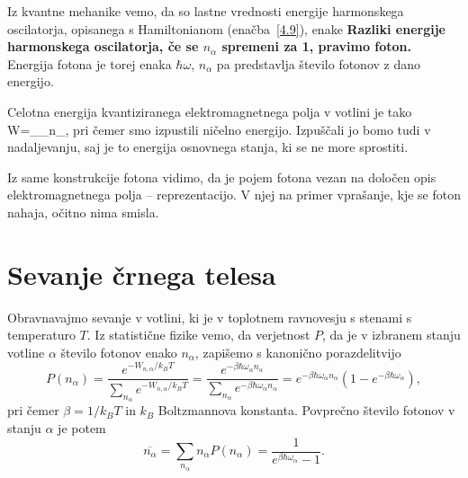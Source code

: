 Iz kvantne mehanike vemo, da so lastne vrednosti energije harmonskega oscilatorja, 
opisanega s Hamiltonianom (enačba~\ref{4.9}), enake
{\bf Razliki energije harmonskega oscilatorja, če se $n_{\alpha}$
spremeni za 1, pravimo foton.} Energija
fotona je torej enaka $\hbar \omega$, $n_\alpha$ pa predstavlja število fotonov z dano energijo. 

Celotna energija kvantiziranega elektromagnetnega polja v votlini
je tako 
\beq
W=\sum_{\alpha}\hbar\omega_{\alpha}n_{\alpha},
\eeq
pri čemer smo izpustili ničelno energijo. Izpuščali jo bomo tudi v nadaljevanju, saj
je to energija osnovnega stanja, ki se ne more sprostiti. 

Iz same konstrukcije fotona vidimo,
da je pojem fotona vezan na določen opis elektromagnetnega polja --
reprezentacijo. V njej na primer vprašanje, kje se foton nahaja, očitno
nima smisla.

\section{Sevanje črnega telesa}

Obravnavajmo sevanje v votlini, ki je v toplotnem ravnovesju s stenami s temperaturo
$T$. Iz statistične fizike vemo, da verjetnost $P$, da je v izbranem stanju 
votline $\alpha$ število fotonov enako $n_{\alpha}$, zapišemo s kanonično porazdelitvijo
\begin{equation}
P(n_{\alpha})=\frac{e^{-W_{n,\alpha}/k_BT}}{\sum_{n_{\alpha}}e^{-W_{n,\alpha}/k_BT}} = 
\frac{e^{-\beta\hbar\omega_{\alpha}n_{\alpha}}}
{\sum_{n_{\alpha}}e^{-\beta\hbar\omega_{\alpha}n_{\alpha}}}=
e^{-\beta\hbar\omega_{\alpha}n_{\alpha}}(1-e^{-\beta\hbar\omega_{\alpha}}),
\label{4.12}
\end{equation}
pri čemer $\beta = 1/k_BT$ in $k_B$ Boltzmannova konstanta. Povprečno število fotonov 
v stanju $\alpha$ je potem
\begin{equation}
\overline{n_{\alpha}}=\sum_{n_{\alpha}}n_{\alpha}P(n_{\alpha})=\frac{1}{e^{\beta\hbar\omega_{\alpha}}-1}.
\label{4.13}
\end{equation}

